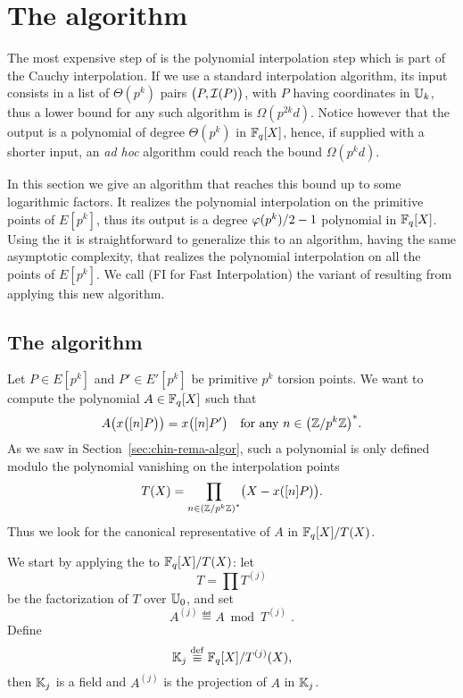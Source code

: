 

\section{The algorithm }
\label{sec:C2-AS-FI}

The most expensive step of \ctwoas{} is the polynomial interpolation step
which is part of the Cauchy interpolation. If we use a standard
interpolation algorithm, its input consists in a list of $\Theta(p^k)$
pairs $\bigl(P, \mathcal{I}(P)\bigr)$, with $P$ having coordinates in $\mathbb{U}_k$,
thus a lower bound for any such algorithm is $\Omega(p^{2k}d)$. Notice
however that the output is a polynomial of degree $\Theta(p^k)$ in
$\mathbb{F}_q[X]$, hence, if supplied with a shorter input, an \emph{ad hoc}
algorithm could reach the bound $\Omega(p^kd)$.

In this section we give an algorithm that reaches this bound up to
some logarithmic factors. It realizes the polynomial interpolation on
the primitive points of $E[p^k]$, thus its output is a degree
$\varphi(p^k)/2-1$ polynomial in $\mathbb{F}_q[X]$. Using the
 it is straightforward to generalize
this to an algorithm, having the same asymptotic complexity, that
realizes the polynomial interpolation on all the points of
$E[p^k]$. We call \ctwoasfi{} (FI for Fast Interpolation) the variant of
\ctwoas{} resulting from applying this new algorithm.


\subsection{The algorithm}
Let $P\in E[p^k]$ and $P'\in E'[p^k]$ be primitive $p^k$ torsion
points. We want to compute the polynomial $A\in\mathbb{F}_q[X]$ such that
\begin{equation}
  A\bigl(x\bigl([n]P\bigr)\bigr) = x\bigl([n]P'\bigr)
  \quad\text{for any $n\in\left(\mathbb{Z}/p^k\mathbb{Z}\right)^\ast$.}
\end{equation}
As we saw in Section~\ref{sec:chin-rema-algor}, such a polynomial is
only defined modulo the polynomial vanishing on the interpolation
points
\begin{equation}
  T(X) = \prod_{n\in\left(\mathbb{Z}/p^k\mathbb{Z}\right)^\ast} \bigl(X - x([n]P)\bigr)
  \text{.}
\end{equation}
Thus we look for the canonical representative of $A$ in $\mathbb{F}_q[X]/T(X)$.

We start by applying the  to
$\mathbb{F}_q[X]/T(X)$: let
\begin{equation}
  \label{eq:T}
  T = \prod T^{(j)}
\end{equation}
be the factorization of $T$ over $\mathbb{U}_0$, and set
\begin{equation}
  \label{eq:A}
  A^{(j)} \eqdef A \bmod T^{(j)}
  \;\text{.}
\end{equation}
Define
\begin{equation}
  \label{eq:187}
  \mathbb{K}_j\overset{\mathrm{def}}{\equiv}\mathbb{F}_q[X]/T^{(j)}(X)  
  \text{,}
\end{equation}
then $\mathbb{K}_j$ is a field and $A^{(j)}$ is the projection of $A$ in
$\mathbb{K}_j$.

